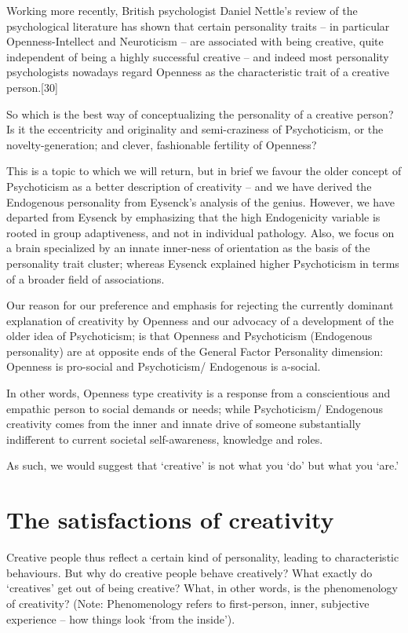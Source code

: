 \documentclass[
]{book}
\begin{document}
Working more recently, British psychologist Daniel Nettle's review of the psychological literature has shown that certain personality traits -- in particular Openness-Intellect and Neuroticism -- are associated with being creative, quite independent of being a highly successful creative -- and indeed most personality psychologists nowadays regard Openness as the characteristic trait of a creative person.{[}30{]}

So which is the best way of conceptualizing the personality of a creative person? Is it the eccentricity and originality and semi-craziness of Psychoticism, or the novelty-generation; and clever, fashionable fertility of Openness?

This is a topic to which we will return, but in brief we favour the older concept of Psychoticism as a better description of creativity -- and we have derived the Endogenous personality from Eysenck's analysis of the genius. However, we have departed from Eysenck by emphasizing that the high Endogenicity variable is rooted in group adaptiveness, and not in individual pathology. Also, we focus on a brain specialized by an innate inner-ness of orientation as the basis of the personality trait cluster; whereas Eysenck explained higher Psychoticism in terms of a broader field of associations.

Our reason for our preference and emphasis for rejecting the currently dominant explanation of creativity by Openness and our advocacy of a development of the older idea of Psychoticism; is that Openness and Psychoticism (Endogenous personality) are at opposite ends of the General Factor Personality dimension: Openness is pro-social and Psychoticism/ Endogenous is a-social.

In other words, Openness type creativity is a response from a conscientious and empathic person to social demands or needs; while Psychoticism/ Endogenous creativity comes from the inner and innate drive of someone substantially indifferent to current societal self-awareness, knowledge and roles.

As such, we would suggest that `creative' is not what you `do' but what you `are.'

\hypertarget{the-satisfactions-of-creativity}{%
\section{The satisfactions of creativity}\label{the-satisfactions-of-creativity}}

Creative people thus reflect a certain kind of personality, leading to characteristic behaviours. But why do creative people behave creatively? What exactly do `creatives' get out of being creative? What, in other words, is the phenomenology of creativity? (Note: Phenomenology refers to first-person, inner, subjective experience -- how things look `from the inside').
\end{document}
